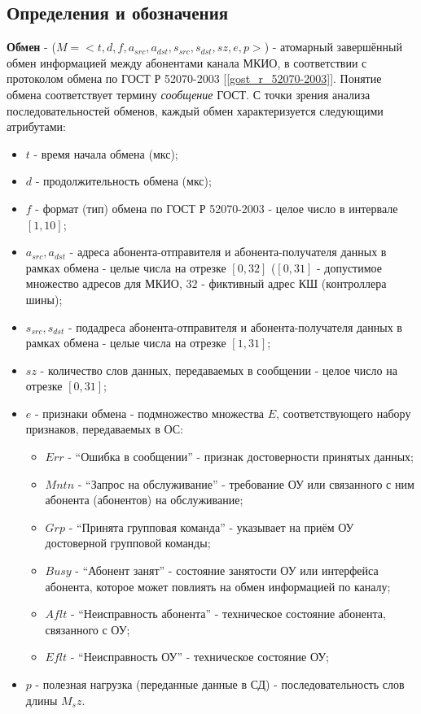 \subsection{Определения и обозначения}


\textbf{Обмен} - ($M = <t, d, f, a_{src}, a_{dst}, s_{src}, s_{dst}, sz, e, p 
>$) - атомарный завершённый обмен информацией между абонентами канала МКИО, в 
соответствии с протоколом обмена по ГОСТ Р 52070-2003 
[\ref{gost_r_52070-2003}]. Понятие обмена соответствует термину 
\textit{сообщение} ГОСТ. С точки зрения анализа последовательностей обменов, 
каждый обмен характеризуется следующими атрибутами:

\begin{itemize}
 \item $t$ - время начала обмена (мкс);
 \item $d$ - продолжительность обмена (мкс);
 \item $f$ - формат (тип) обмена по ГОСТ Р 52070-2003 - целое число в интервале 
$[1, 10]$;
 \item $a_{src}, a_{dst}$ - адреса абонента-отправителя и абонента-получателя 
данных в рамках обмена - целые числа на отрезке $[0, 32]$ ($[0, 31]$ - 
допустимое множество адресов для МКИО, $32$ - фиктивный адрес КШ (контроллера 
шины);
 \item $s_{src}, s_{dst}$ - подадреса абонента-отправителя и 
абонента-получателя данных в рамках обмена - целые числа на отрезке $[1, 31]$;
 \item $sz$ - количество слов данных, передаваемых в сообщении - целое число на 
отрезке $[0, 31]$;
 \item $e$ - признаки обмена - подмножество множества $E$, 
соответствующего набору признаков, передаваемых в ОС:
 \begin{itemize}
  \item $Err$ - ``Ошибка в сообщении'' - признак достоверности принятых данных;
  \item $Mntn$ - ``Запрос на обслуживание'' - требование ОУ или связанного с 
ним абонента (абонентов) на обслуживание;
  \item $Grp$ - ``Принята групповая команда'' - указывает на приём ОУ 
достоверной групповой команды;
  \item $Busy$ - ``Абонент занят'' - состояние занятости ОУ или интерфейса 
абонента, которое может повлиять на обмен информацией по каналу;
  \item $Aflt$ - ``Неисправность абонента'' - техническое состояние абонента, 
связанного с ОУ;
  \item $Eflt$ - ``Неисправность ОУ'' - техническое состояние ОУ;
 \end{itemize}
 \item $p$ - полезная нагрузка (переданные данные в СД) - последовательность 
слов длины $M_sz$.
\end{itemize}

